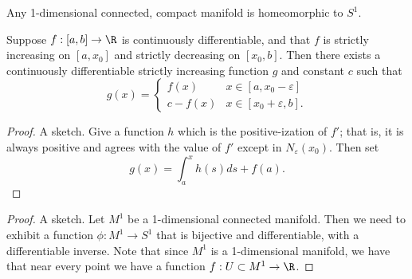 \documentclass{notes}
\begin{document}
\begin{theorem}
 Any 1-dimensional connected, compact manifold is homeomorphic to $S^1$.
\end{theorem}
\begin{lemma}
  Suppose $f:[a,b] \to \R$ is continuously differentiable, and that $f$ is strictly increasing on
  $[a, x_0]$ and strictly decreasing on $[x_0, b]$. Then there exists a continuously differentiable
  strictly increasing function $g$ and constant $c$ such that 
  $$g(x) = \begin{cases} f(x) &x\in[a, x_0 - \varepsilon] \\ c - f(x) &x\in [x_0 + \varepsilon, b].
  \end{cases}$$
\end{lemma}
\begin{proof}
  A sketch. Give a function $h$ which is the positive-ization of $f'$; that is, it is always
  positive and agrees with the value of $f'$ except in $N_\varepsilon(x_0)$. Then set 
  $$g(x) = \int_a^x h(s)ds + f(a).$$
\end{proof}
\begin{proof}
  A sketch. Let $M^1$ be a 1-dimensional connected manifold. Then we need to exhibit a function
  $\phi: M^1 \to S^1$ that is bijective and differentiable, with a differentiable inverse. Note that
  since $M^1$ is a 1-dimensional manifold, we have that near every point we have a function $f:
  U\subset M^1 \to \R$.
\end{proof}
\end{document}
